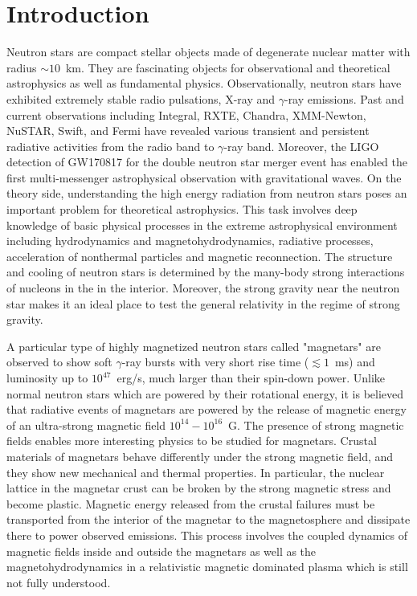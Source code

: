 
\chapter{Introduction}
\label{chap:intro}

Neutron stars are compact stellar objects made of degenerate nuclear matter with radius $\sim 10$~km.
They are fascinating objects for observational and theoretical astrophysics as well as fundamental physics.
Observationally, neutron stars have exhibited extremely stable radio pulsations, X-ray and $\gamma$-ray emissions. 
Past and current observations including Integral, RXTE, 
Chandra, 
XMM-Newton, 
NuSTAR, 
Swift, 
and Fermi
have revealed various transient and persistent radiative activities from the radio band to $\gamma$-ray band.
Moreover, the LIGO detection of GW170817 for the double neutron star merger event \citep{2017ApJ...848L..12A} has enabled the first multi-messenger astrophysical observation with gravitational waves.
On the theory side, understanding the high energy radiation from neutron stars poses an important problem for theoretical astrophysics.
This task involves deep knowledge of basic physical processes in the extreme astrophysical environment including hydrodynamics and magnetohydrodynamics, radiative processes, acceleration of nonthermal particles and magnetic reconnection.
The structure and cooling of neutron stars is determined by the many-body strong interactions of nucleons in the in the interior.
Moreover, the strong gravity near the neutron star makes it an ideal place to test the general relativity in the regime of strong gravity.

A particular type of highly magnetized neutron stars called "magnetars" are observed to show soft $\gamma$-ray bursts with very short rise time ($\lesssim 1$~ms) and luminosity up to $10^{47}$~erg/s, much larger than their spin-down power.
Unlike normal neutron stars which are powered by their rotational energy, it is believed that radiative events of magnetars are powered by the release of magnetic energy of an ultra-strong magnetic field $10^{14}-10^{16}$~G. 
The presence of strong magnetic fields enables more interesting physics to be studied for magnetars.
Crustal materials of magnetars behave differently under the strong magnetic field, and they show new mechanical and thermal properties. 
In particular, the nuclear lattice in the magnetar crust can be broken by the strong magnetic stress and become plastic.
Magnetic energy released from the crustal failures must be transported from the interior of the magnetar to the magnetosphere and dissipate there to power observed emissions.
This process involves the coupled dynamics of magnetic fields inside and outside the magnetars as well as the magnetohydrodynamics in a relativistic magnetic dominated plasma which is still not fully understood.


